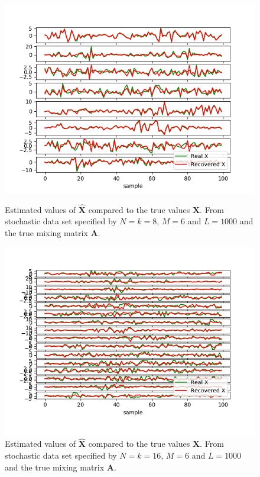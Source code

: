 \begin{figure}[H]
    \begin{minipage}[t]{.45\textwidth}
    	\centering
		\includegraphics[scale=0.5]{figures/ch_6/M-SBL_AR1.png}
		\caption{Estimated values of $\hat{\mathbf{X}}$ compared to the true 					values $\mathbf{X}$. From stochastic data set specified by $N = k = 8$, $M = 6$ and $L=1000$ and the true mixing matrix $\mathbf{A}$.}
		\label{fig:AR1}
    \end{minipage} 
    \hfill
    \begin{minipage}[t]{.45\textwidth}
        \centering
		\includegraphics[scale=0.5]{figures/ch_6/M-SBL_AR2.png}
		\caption{Estimated values of $\hat{\mathbf{X}}$ compared to the true 					values $\mathbf{X}$. From stochastic data set specified by $N = k = 16$, $M = 6$ and $L=1000$ and the true mixing matrix $\mathbf{A}$.}
		\label{fig:AR2}
    \end{minipage}
\end{figure}
